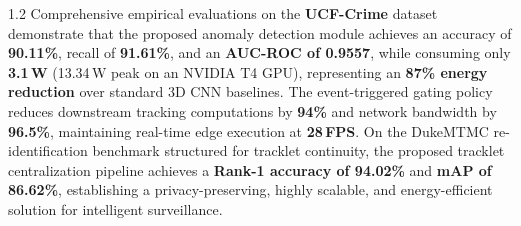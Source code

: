 \begin{spacing}{1.2}
\noindent Comprehensive empirical evaluations on the \textbf{UCF-Crime} dataset demonstrate that the proposed anomaly detection module achieves an accuracy of \textbf{90.11\%}, recall of \textbf{91.61\%}, and an \textbf{AUC-ROC of 0.9557}, while consuming only \textbf{3.1\,W} (13.34\,W peak on an NVIDIA T4 GPU), representing an \textbf{87\% energy reduction} over standard 3D CNN baselines. The event-triggered gating policy reduces downstream tracking computations by \textbf{94\%} and network bandwidth by \textbf{96.5\%}, maintaining real-time edge execution at \textbf{28\,FPS}. On the DukeMTMC re-identification benchmark structured for tracklet continuity, the proposed tracklet centralization pipeline achieves a \textbf{Rank-1 accuracy of 94.02\%} and \textbf{mAP of 86.62\%}, establishing a privacy-preserving, highly scalable, and energy-efficient solution for intelligent surveillance.
\end{spacing}

\thispagestyle{plain}
